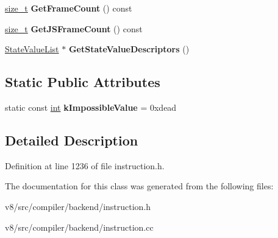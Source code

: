 \begin{DoxyCompactItemize}
\item 
\mbox{\label{classv8_1_1internal_1_1compiler_1_1FrameStateDescriptor_a4324a721ce9b1e24af4cf532c3824872}} 
\mbox{\hyperlink{classsize__t}{size\+\_\+t}} {\bfseries Get\+Frame\+Count} () const
\item 
\mbox{\label{classv8_1_1internal_1_1compiler_1_1FrameStateDescriptor_a1435ec1098de1dc1d057e60c9ea1fd95}} 
\mbox{\hyperlink{classsize__t}{size\+\_\+t}} {\bfseries Get\+J\+S\+Frame\+Count} () const
\item 
\mbox{\label{classv8_1_1internal_1_1compiler_1_1FrameStateDescriptor_a345c8c5754835cdfd457b2251f10f68d}} 
\mbox{\hyperlink{classv8_1_1internal_1_1compiler_1_1StateValueList}{State\+Value\+List}} $\ast$ {\bfseries Get\+State\+Value\+Descriptors} ()
\end{DoxyCompactItemize}
\subsection*{Static Public Attributes}
\begin{DoxyCompactItemize}
\item 
\mbox{\label{classv8_1_1internal_1_1compiler_1_1FrameStateDescriptor_ae8cb39ff5c6361596812548e22d34a54}} 
static const \mbox{\hyperlink{classint}{int}} {\bfseries k\+Impossible\+Value} = 0xdead
\end{DoxyCompactItemize}


\subsection{Detailed Description}


Definition at line 1236 of file instruction.\+h.



The documentation for this class was generated from the following files\+:\begin{DoxyCompactItemize}
\item 
v8/src/compiler/backend/instruction.\+h\item 
v8/src/compiler/backend/instruction.\+cc\end{DoxyCompactItemize}
